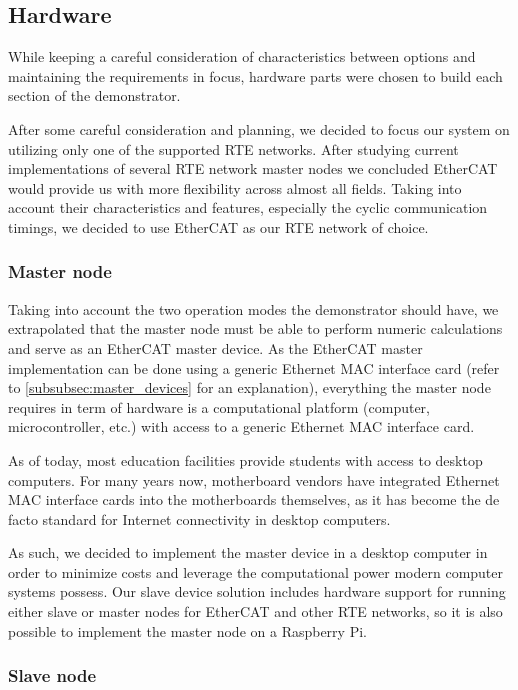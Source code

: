 \subsection{Hardware} \label{sec:proposed-hardware}

While keeping a careful consideration of characteristics between options and maintaining the requirements in focus, hardware parts were chosen to build each section of the demonstrator.

After some careful consideration and planning, we decided to focus our system on utilizing only one of the supported RTE networks.
After studying current implementations of several RTE network master nodes we concluded EtherCAT \cite{protocol:ethercat} would provide us with more flexibility across almost all fields.
Taking into account their characteristics and features, especially the cyclic communication timings, we decided to use EtherCAT as our RTE network of choice.

\subsubsection{Master node}

Taking into account the two operation modes the demonstrator should have, we extrapolated that the master node must be able to perform numeric calculations and serve as an EtherCAT master device.
As the EtherCAT master implementation can be done using a generic Ethernet MAC interface card (refer to \autoref{subsubsec:master_devices} for an explanation), everything the master node requires in term of hardware is a computational platform (computer, microcontroller, etc.) with access to a generic Ethernet MAC interface card.

As of today, most education facilities provide students with access to desktop computers.
For many years now, motherboard vendors have integrated Ethernet MAC interface cards into the motherboards themselves, as it has become the de facto standard for Internet connectivity in desktop computers.

As such, we decided to implement the master device in a desktop computer in order to minimize costs and leverage the computational power modern computer systems possess.
Our slave device solution includes hardware support for running either slave or master nodes for EtherCAT and other RTE networks, so it is also possible to implement the master node on a Raspberry Pi.

\subsubsection{Slave node} \label{subsubsec:slave_hdw}


